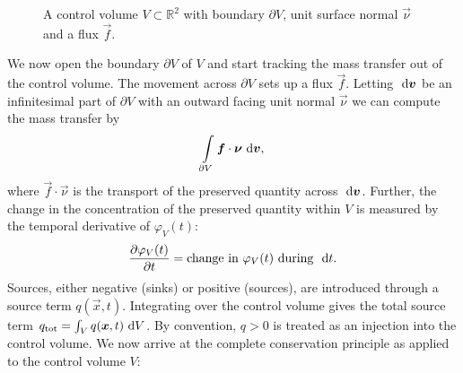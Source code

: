 \begin{figure}[ht]
\centering
{}
\caption{A control volume $V \subset \mathbb{R}^2$ with boundary $\partial V$, unit surface normal $\vec{\nu}$ and a flux $\vec{f}$.}
\label{fig:control_volume}
\end{figure}
We now open the boundary $\partial V$ of $V$ and start tracking the mass transfer out of the control volume. The movement across $\partial V$ sets up a flux $\vec{f}$. Letting $\ \text{d}\boldsymbol{v}$ be an infinitesimal part of $\partial V$ with an outward facing unit normal $\vec{\nu}$ we can compute the mass transfer by
\begin{equation*}
 \int \limits_{\partial V} \boldsymbol{f} \cdot \boldsymbol{\nu} \ \text{d}\boldsymbol{v},
\end{equation*}
where $\vec{f} \cdot \vec{\nu}$ is the transport of the preserved quantity across $\ \text{d}\boldsymbol{v}$. Further, the change in the concentration of the preserved quantity within $V$ is measured by the temporal derivative of $\varphi_V(t)$:
\begin{equation*}
\frac{\partial \varphi_V(t)}{\partial t} = \text{change in $\varphi_V(t)$ during $\ \text{d}t$}.
\end{equation*}
Sources, either negative (sinks) or positive (sources), are introduced through a source term $q(\vec{x},t)$. Integrating over the control volume gives the total source term $q_{\text{tot}} = \int_V q(\boldsymbol{x},t) \ \text{d}V$. By convention, $q > 0$ is treated as an injection into the control volume. We now arrive at the complete conservation principle as applied to the control volume $V$:
